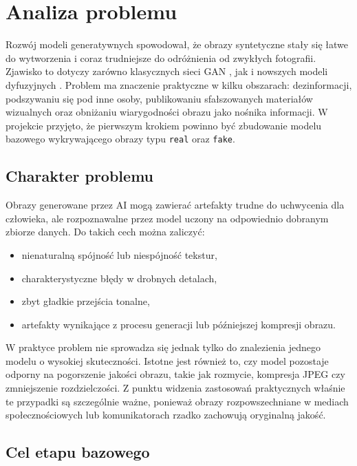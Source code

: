 \newpage
\section{Analiza problemu}

Rozwój modeli generatywnych spowodował, że obrazy syntetyczne stały się łatwe do wytworzenia i coraz trudniejsze do odróżnienia od zwykłych fotografii. Zjawisko to dotyczy zarówno klasycznych sieci GAN \cite{goodfellow2014gan}, jak i nowszych modeli dyfuzyjnych \cite{ho2020ddpm}. Problem ma znaczenie praktyczne w kilku obszarach: dezinformacji, podszywaniu się pod inne osoby, publikowaniu sfałszowanych materiałów wizualnych oraz obniżaniu wiarygodności obrazu jako nośnika informacji. W projekcie przyjęto, że pierwszym krokiem powinno być zbudowanie modelu bazowego wykrywającego obrazy typu \texttt{real} oraz \texttt{fake}.

\subsection{Charakter problemu}

Obrazy generowane przez AI mogą zawierać artefakty trudne do uchwycenia dla człowieka, ale rozpoznawalne przez model uczony na odpowiednio dobranym zbiorze danych. Do takich cech można zaliczyć:

\begin{itemize}
    \item nienaturalną spójność lub niespójność tekstur,
    \item charakterystyczne błędy w drobnych detalach,
    \item zbyt gładkie przejścia tonalne,
    \item artefakty wynikające z procesu generacji lub późniejszej kompresji obrazu.
\end{itemize}

W praktyce problem nie sprowadza się jednak tylko do znalezienia jednego modelu o wysokiej skuteczności. Istotne jest również to, czy model pozostaje odporny na pogorszenie jakości obrazu, takie jak rozmycie, kompresja JPEG czy zmniejszenie rozdzielczości. Z punktu widzenia zastosowań praktycznych właśnie te przypadki są szczególnie ważne, ponieważ obrazy rozpowszechniane w mediach społecznościowych lub komunikatorach rzadko zachowują oryginalną jakość.

\newpage
\subsection{Cel etapu bazowego}

